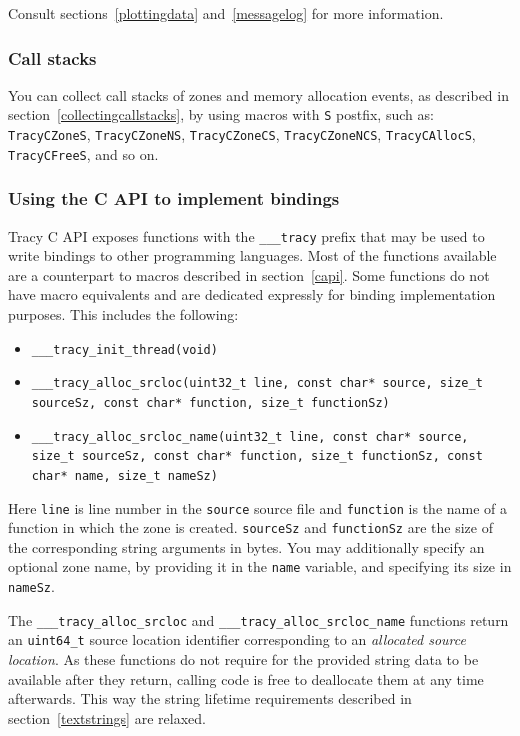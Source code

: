 \documentclass[hidelinks,titlepage,a4paper]{article}
\begin{document}
Consult sections~\ref{plottingdata} and~\ref{messagelog} for more information.

\subsubsection{Call stacks}

You can collect call stacks of zones and memory allocation events, as described in section~\ref{collectingcallstacks}, by using macros with \texttt{S} postfix, such as: \texttt{TracyCZoneS}, \texttt{TracyCZoneNS}, \texttt{TracyCZoneCS}, \texttt{TracyCZoneNCS}, \texttt{TracyCAllocS}, \texttt{TracyCFreeS}, and so on.

\subsubsection{Using the C API to implement bindings}
\label{capibindings}

Tracy C API exposes functions with the \texttt{\_\_\_tracy} prefix that may be used to write bindings to other programming languages. Most of the functions available are a counterpart to macros described in section~\ref{capi}. Some functions do not have macro equivalents and are dedicated expressly for binding implementation purposes. This includes the following:

\begin{itemize}
\item \texttt{\_\_\_tracy\_init\_thread(void)}
\item \texttt{\_\_\_tracy\_alloc\_srcloc(uint32\_t line, const char* source, size\_t sourceSz, const char* function, size\_t functionSz)}
\item \texttt{\_\_\_tracy\_alloc\_srcloc\_name(uint32\_t line, const char* source, size\_t sourceSz, const char* function, size\_t functionSz, const char* name, size\_t nameSz)}
\end{itemize}

Here \texttt{line} is line number in the \texttt{source} source file and \texttt{function} is the
name of a function in which the zone is created. \texttt{sourceSz} and \texttt{functionSz} are the
size of the corresponding string arguments in bytes. You may additionally specify an optional zone
name, by providing it in the \texttt{name} variable, and specifying its size in \texttt{nameSz}.

The \texttt{\_\_\_tracy\_alloc\_srcloc} and \texttt{\_\_\_tracy\_alloc\_srcloc\_name} functions
return an \texttt{uint64\_t} source location identifier corresponding to an \emph{allocated source
location}. As these functions do not require for the provided string data to be available after they
return, calling code is free to deallocate them at any time afterwards. This way the string
lifetime requirements described in section~\ref{textstrings} are relaxed.
\end{document}
